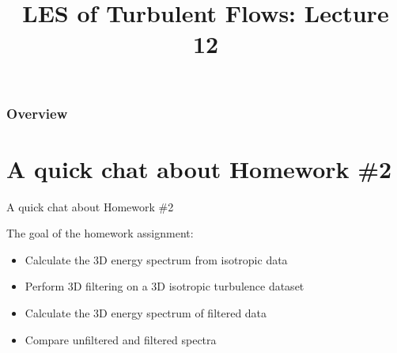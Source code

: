 
\title{LES of Turbulent Flows: Lecture 12}




\begin{frame} 
  \titlepage
\end{frame}


\begin{frame}
\frametitle{Overview}
\tableofcontents
\end{frame}

\section{A quick chat about Homework \#2} %

\begin{frame}{A quick chat about Homework \#2}

The goal of the homework assignment:
\begin{itemize}
	\item Calculate the 3D energy spectrum from isotropic data
	\item Perform 3D filtering on a 3D isotropic turbulence dataset
	\item Calculate the 3D energy spectrum of filtered data
	\item Compare unfiltered and filtered spectra
\end{itemize}

\end{frame}


